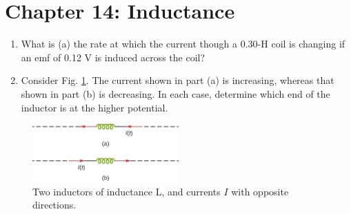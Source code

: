 \documentclass[10pt]{article}
\begin{document}
\section{Chapter 14: Inductance}

\begin{enumerate}
\item What is (a) the rate at which the current though a 0.30-H coil is changing if an emf of 0.12 V is induced across the coil?\\ \vspace{1cm}
\item Consider Fig. \ref{fig:chap14_1}. The current shown in part (a) is increasing, whereas that shown in part (b) is decreasing. In each case, determine which end of the inductor is at the higher potential. \\ \vspace{2cm}
\end{enumerate}

\begin{figure}[hb]
\centering
\includegraphics[width=0.5\textwidth]{induct1.jpeg}
\caption{\label{fig:chap14_1} Two inductors of inductance L, and currents $I$ with opposite directions.}
\end{figure}
\end{document}
